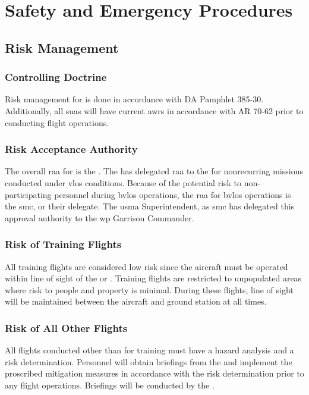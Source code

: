 \chapter{Safety and Emergency Procedures}
\label{ch:safety}

    \section{Risk Management}

        \subsection{Controlling Doctrine} Risk management for \projectmars{} is done in accordance with DA Pamphlet 385-30. Additionally, all \projectmars{} \ac{suas} will have current \ac{awr}s in accordance with AR 70-62 prior to conducting flight operations. 

        \subsection{Risk Acceptance Authority} The overall \ac{raa} for \projectmars{} is the . The  has delegated \ac{raa} to the  for nonrecurring missions conducted under \ac{vlos} conditions. Because of the potential risk to non-participating personnel during \ac{bvlos} operations, the \ac{raa} for \ac{bvlos} operations is the \ac{smc}, or their delegate. The \ac{usma} Superintendent, as \ac{smc} has delegated this approval authority to the \ac{wp} Garrison Commander.

        \subsection{Risk of Training Flights} All \projectmars{} training flights are considered low risk since the aircraft must be operated within line of sight of the  or . Training flights are restricted to unpopulated areas where risk to people and property is minimal. During these flights, line of sight will be maintained between the aircraft and ground station at all times.

        \subsection{Risk of All Other Flights} All \projectmars{} flights conducted other than for training must have a hazard analysis and a risk determination. \projectmars{} Personnel will obtain briefings from the  and implement the proscribed mitigation measures in accordance with the risk determination prior to any flight operations. Briefings will be conducted by the .
        
